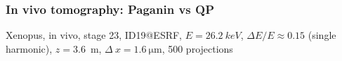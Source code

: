\documentclass{beamer}
\def\imh{0.35\textheight}
\begin{document}
\begin{frame}
  \frametitle{In vivo tomography: Paganin vs QP} 

  Xenopus, in vivo, stage 23, ID19@ESRF, $E=\SI{26.2}{keV}$, $\Delta
  E/E\approx\num{0.15}$ (single harmonic), $z=$\SI{3.6}{m},
  $\Delta~x=\SI{1.6}{\micro\metre}$, 500 projections

\end{frame}
\end{document}
